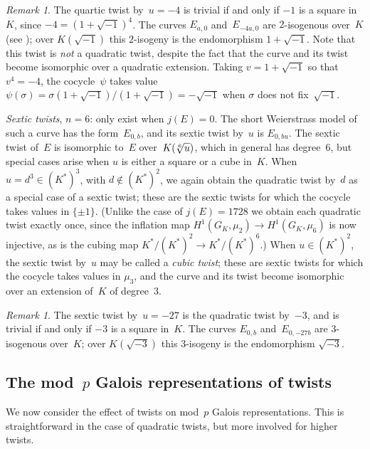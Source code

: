 \documentclass[12pt, reqno]{amsart}
\numberwithin{equation}{section}
\theoremstyle{definition}
\theoremstyle{remark}
\newtheorem{remark}[theorem]{Remark}
\begin{document}
\begin{remark}\label{R:2-isog}
The quartic twist by~$u=-4$ is trivial if and only if $-1$ is a square
in~$K$, since $-4=(1+\sqrt{-1})^4$.  The curves $E_{a,0}$
and~$E_{-4a,0}$ are $2$-isogenous over~$K$ (see
\cite[p. 336]{SilvermanI}); over $K(\sqrt{-1})$ this $2$-isogeny is
the endomorphism $1+\sqrt{-1}$.  Note that this twist is \emph{not} a
quadratic twist, despite the fact that the curve and its twist become
isomorphic over a quadratic extension.  Taking $v=1+\sqrt{-1}$ so that
$v^4=-4$, the cocycle~$\psi$ takes value
$\psi(\sigma)=\sigma(1+\sqrt{-1})/(1+\sqrt{-1})=-\sqrt{-1}$ when
$\sigma$ does not fix~$\sqrt{-1}$.
\end{remark}

\emph{Sextic twists}, $n=6$: only exist when $j(E)=0$.  The short Weierstrass
model of such a curve has the form~$E_{0,b}$, and its sextic twist
by~$u$ is $E_{0,bu}$.  The sextic twist of~$E$ is isomorphic to~$E$
over~$K(\root6\of u)$, which in general has degree~$6$, but special
cases arise when $u$ is either a square or a cube in~$K$.  When
$u=d^3\in(K^*)^3$, with $d\notin(K^*)^2$, we again obtain the
quadratic twist by~$d$ as a special case of a sextic twist; these are
the sextic twists for which the cocycle takes values in $\{\pm1\}$.
(Unlike the case of $j(E)=1728$ we obtain each quadratic twist exactly
once, since the inflation map $H^1(G_K,\mu_2)\to H^1(G_K,\mu_6)$ is
now injective, as is the cubing map $K^*/(K^*)^2 \to K^*/(K^*)^6$.)
When $u\in(K^*)^2$, the sextic twist by~$u$ may be called a
\emph{cubic twist}; these are sextic twists for which the cocycle
takes values in $\mu_3$, and the curve and its twist become isomorphic
over an extension of~$K$ of degree~$3$.

\begin{remark}\label{R:3-isog}
The sextic twist by~$u=-27$ is the quadratic twist by~$-3$, and is
trivial if and only if $-3$ is a square in~$K$.  The curves $E_{0,b}$
and~$E_{0,-27b}$ are $3$-isogenous over~$K$; over $K(\sqrt{-3})$ this
$3$-isogeny is the endomorphism $\sqrt{-3}$.
\end{remark}


\subsection{The mod~$p$ Galois representations of twists}\label{SS:GalRepTwist}
We now consider the effect of twists on mod~$p$ Galois
representations.  This is straightforward in the case of quadratic
twists, but more involved for higher twists.
\end{document}
